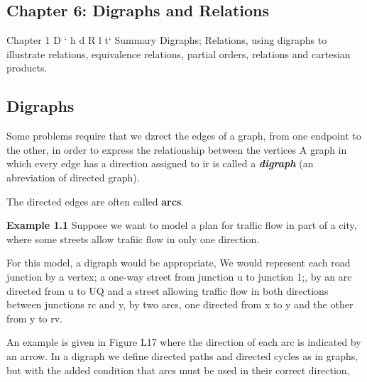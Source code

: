 \documentclass[]{article}
\begin{document}
\subsection*{Chapter 6: Digraphs and Relations}

Chapter 1
D ` h d R l t`
Summary
Digraphs; Relations, using digraphs to illustrate relations, equivalence relations,
partial orders, relations and cartesian products.

\subsection*{Digraphs}
Some problems require that we dzrect the edges of a graph, from one endpoint to
the other, in order to express the relationship between the vertices A graph in
which every edge has a direction assigned to ir is called a \textit{\textbf{digraph}} (an abreviation
of directed graph). 

The directed edges are often called \textbf{arcs}.


\noindent\textbf{Example 1.1} Suppose we want to model a plan for traflic flow in part of a city,
where some streets allow trafiic flow in only one direction. 

For this model, a digraph would be appropriate, We would represent each road junction by a vertex; a one-way street from junction u to junction 1;, by an arc directed from u to UQ and a street allowing traffic flow in both directions between junctions rc and y, by two
arcs, one directed from x to y and the other from y to rv. 

An example is given in
Figure L17 where the direction of each arc is indicated by an arrow.
In a digraph we define directed paths and directed cycles as in graphs, but
with the added condition that arcs must be used in their correct direction, 
\end{document}
